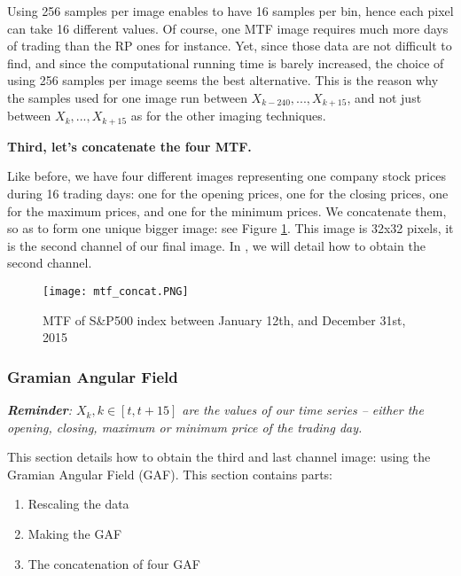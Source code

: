 \documentclass[11pt]{article}
\begin{document}
\begin{onehalfspace}
Using 256 samples per image enables to have 16 samples per bin, hence each pixel can take 16 different values. Of course, one MTF image requires much more days of trading than the RP ones for instance. Yet, since those data are not difficult to find, and since the computational running time is barely increased, the choice of using 256 samples per image seems the best alternative. This is the reason why the samples used for one image run between $X_{k-240},... ,X_{k+15}$, and not just between $X_k,...,X_{k+15}$ as for the other imaging techniques.



\noindent \textbf{Third, let's concatenate the four MTF.}

Like before, we have four different images representing one company stock prices during 16 trading days: one for the opening prices, one for the closing prices, one for the maximum prices, and one for the minimum prices. We concatenate them, so as to form one unique bigger image: see Figure \ref{fig:mtf_concat}. This image is 32x32 pixels, it is the second channel of our final image. In , we will detail how to obtain the second channel.

\begin{figure}[h!]
    \centering
    \captionsetup{justification=centering}
    \texttt{[image: mtf\_concat.PNG]}
    \caption{MTF of S\&P500 index between January 12th, and December 31st, 2015}
\label{fig:mtf_concat}
\end{figure}

\subsubsection{Gramian Angular Field}
\label{sec:gaf}

\textit{\textbf{Reminder}: $X_k, k \in [t, t+15]$ are the values of our time series -- either the opening, closing, maximum or minimum price of the trading day.}

This section details how to obtain the third and last channel image: using the Gramian Angular Field (GAF). This section contains parts:

\begin{enumerate}
    \item Rescaling the data
    \item Making the GAF
    \item The concatenation of four GAF
\end{enumerate}


\end{onehalfspace}
\end{document}
